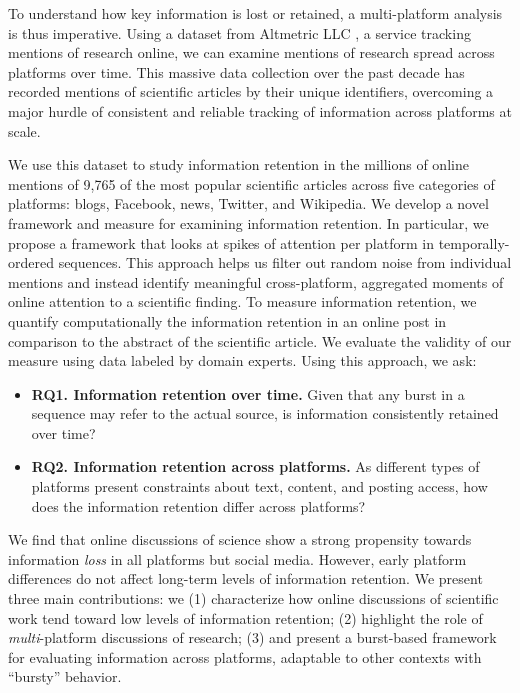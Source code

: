 \documentclass[letterpaper]{article} %
\begin{document}
To understand how key information is lost or retained, a multi-platform analysis is thus imperative. %
Using a dataset from Altmetric LLC \citep{altmetricsupportOurDataOur2021}, a service tracking mentions of research online, we can examine mentions of research spread across platforms over time. This massive data collection over the past decade has recorded mentions of scientific articles by their unique identifiers, overcoming a major hurdle of consistent and reliable tracking of information across platforms at scale. %

We use this dataset to study information retention in the millions of online mentions of 9,765 of the most popular scientific articles across five categories of platforms: blogs, Facebook, news, Twitter, and Wikipedia. We develop a novel framework and measure for examining information retention.
In particular, we propose a framework that looks at spikes of attention \cite[aka bursts, see][]{Kleinberg2003,barabasiOriginBurstsHeavy2005,chengCascadesRecur2016} per platform in temporally-ordered sequences. This approach helps us filter out random noise from individual mentions and instead identify meaningful cross-platform, aggregated moments of online attention to a scientific finding.
To measure information retention, we quantify computationally the information retention in an online post in comparison to the abstract of the scientific article. We evaluate the validity of our measure using data labeled by domain experts.
Using this approach, we ask:

\begin{itemize}
    \item %
    \textbf{RQ1. Information retention over time.} Given that any burst in a sequence may refer to the actual source, is information consistently retained over time?
    \item %
    \textbf{RQ2. Information retention across platforms.} As different types of platforms present constraints about text, content, and posting access, how does the information retention differ across platforms?
\end{itemize}

We find that online discussions of science show a strong propensity towards information \textit{loss} in all platforms but social media. However, early platform differences do not affect long-term levels of information retention.
We present three main contributions: we (1) characterize how online discussions of scientific work tend toward low levels of information retention; (2) highlight the role of \textit{multi}-platform discussions of research; (3) and present a burst-based framework for evaluating information across platforms, adaptable to other contexts with ``bursty'' behavior.
\end{document}
